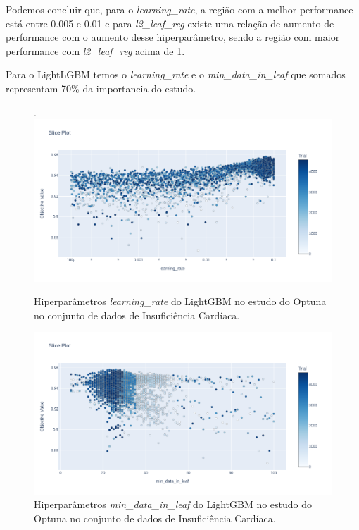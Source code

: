 Podemos concluir que, para o \textit{learning\_rate}, a região com a melhor performance está entre 0.005 e 0.01 e para \textit{l2\_leaf\_reg} existe uma relação de aumento de performance com o aumento desse hiperparâmetro, sendo a região com maior performance com \textit{l2\_leaf\_reg} acima de 1.

Para o LightLGBM temos o \textit{learning\_rate} e o \textit{min\_data\_in\_leaf} que somados representam 70\% da importancia do estudo.
\begin{figure}[H]
 \caption{Hiperparâmetros \textit{learning\_rate}  do LightGBM no estudo do Optuna no conjunto de dados de Insuficiência Cardíaca.}.
 \label{fig:op:heart:learn:lgbm}
 \centering
 \includegraphics[scale=0.3]{images/optuna_lgbm_learning_heart.png}
\end{figure}
\begin{figure}[H]
 \caption{Hiperparâmetros \textit{min\_data\_in\_leaf} do LightGBM no estudo do Optuna no conjunto de dados de Insuficiência Cardíaca.}
 \label{fig:op:heart:min:lgbm}
 \centering
 \includegraphics[scale=0.3]{images/optuna_lgbm_min_heart.png}
\end{figure}

